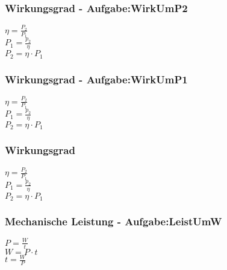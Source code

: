 \subsubsection{Wirkungsgrad - Aufgabe:WirkUmP2} 
\begin{minipage}{0.45\textwidth} 
$ \eta  = \frac{P_{2} }{P_{1} } $\\ 
$ P_{1}  = \frac{p_{2} }{\eta } $\\ 
$ P_{2}  = \eta \cdot P_{1} $\\ 
\end{minipage} 
\begin{minipage}{0.45\textwidth} 
 
\end{minipage} 
\subsubsection{Wirkungsgrad - Aufgabe:WirkUmP1} 
\begin{minipage}{0.45\textwidth} 
$ \eta  = \frac{P_{2} }{P_{1} } $\\ 
$ P_{1}  = \frac{p_{2} }{\eta } $\\ 
$ P_{2}  = \eta \cdot P_{1} $\\ 
\end{minipage} 
\begin{minipage}{0.45\textwidth} 
 
\end{minipage} 
\subsubsection{Wirkungsgrad} 
\begin{minipage}{0.45\textwidth} 
$ \eta  = \frac{P_{2} }{P_{1} } $\\ 
$ P_{1}  = \frac{p_{2} }{\eta } $\\ 
$ P_{2}  = \eta \cdot P_{1} $\\ 
\end{minipage} 
\begin{minipage}{0.45\textwidth} 
 
\end{minipage} 
\subsubsection{Mechanische Leistung - Aufgabe:LeistUmW} 
\begin{minipage}{0.45\textwidth} 
$ P = \frac{W}{t} $\\ 
$ W = P\cdot t $\\ 
$ t = \frac{W}{P} $\\ 
\end{minipage} 
\begin{minipage}{0.45\textwidth} 
 
\end{minipage} 
